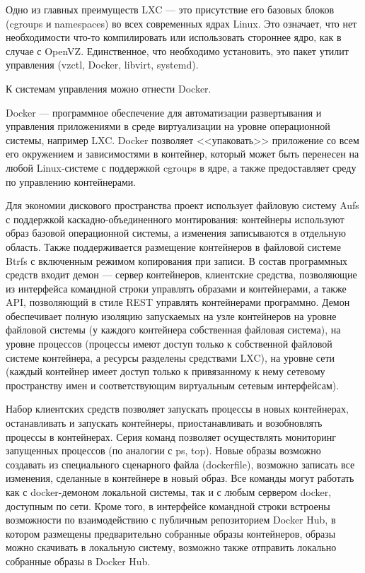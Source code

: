 Одно из главных преимуществ LXC --- это присутствие его базовых блоков (cgroups и namespaces) во всех современных ядрах Linux.
Это означает, что нет необходимости что-то компилировать или использовать стороннее ядро, как в случае с OpenVZ.
Единственное, что необходимо установить, это пакет утилит управления (vzctl, Docker, libvirt, systemd).

К системам управления можно отнести Docker.

Docker --- программное обеспечение для автоматизации развертывания и управления приложениями в среде виртуализации на уровне операционной системы, например LXC.
Docker позволяет <<упаковать>> приложение со всем его окружением и зависимостями в контейнер, который может быть перенесен на любой Linux-системе с поддержкой cgroups в ядре, а также предоставляет среду по управлению контейнерами.

Для экономии дискового пространства проект использует файловую систему Aufs с поддержкой каскадно-объединенного монтирования: контейнеры используют образ базовой операционной системы, а изменения записываются в отдельную область.
Также поддерживается размещение контейнеров в файловой системе Btrfs с включенным режимом копирования при записи.
В состав программных средств входит демон --- сервер контейнеров, клиентские средства, позволяющие из интерфейса командной строки управлять образами и контейнерами, а также API, позволяющий в стиле REST управлять контейнерами программно.
Демон обеспечивает полную изоляцию запускаемых на узле контейнеров на уровне файловой системы (у каждого контейнера собственная файловая система), на уровне процессов (процессы имеют доступ только к собственной файловой системе контейнера, а ресурсы разделены средствами LXC), на уровне сети (каждый контейнер имеет доступ только к привязанному к нему сетевому пространству имен и соответствующим виртуальным сетевым интерфейсам).

Набор клиентских средств позволяет запускать процессы в новых контейнерах, останавливать и запускать контейнеры, приостанавливать и возобновлять процессы в контейнерах.
Серия команд позволяет осуществлять мониторинг запущенных процессов (по аналогии с ps, top).
Новые образы возможно создавать из специального сценарного файла (dockerfile), возможно записать все изменения, сделанные в контейнере в новый образ.
Все команды могут работать как с docker-демоном локальной системы, так и с любым сервером docker, доступным по сети.
Кроме того, в интерфейсе командной строки встроены возможности по взаимодействию с публичным репозиторием Docker Hub, в котором размещены предварительно собранные образы контейнеров, образы можно скачивать в локальную систему, возможно также отправить локально собранные образы в Docker Hub.

\clearpage
